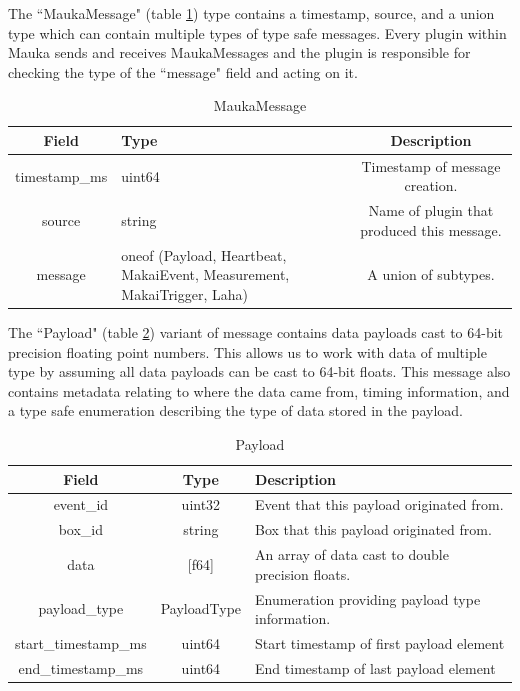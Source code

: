 The ``MaukaMessage" (table \ref{table:MaukaMessage}) type contains a timestamp, source, and a union type which can contain multiple types of type safe messages. Every plugin within Mauka sends and receives MaukaMessages and the plugin is responsible for checking the type of the ``message" field and acting on it.

\begin{table}[H]
	\centering
	\caption{MaukaMessage}
	\begin{tabular}{|c|p{6cm}|c|}
		\hline 
		Field & Type & Description  \\ 
		\hline 
		timestamp\_ms & uint64 & Timestamp of message creation.  \\ 
		\hline 
		source & string & Name of plugin that produced this message. \\ 
		\hline 
		message & oneof (Payload, Heartbeat, MakaiEvent, Measurement, MakaiTrigger, Laha) & A union of subtypes. \\ 
		\hline 
	\end{tabular} 
	\label{table:MaukaMessage}
\end{table}

The ``Payload" (table \ref{table:Payload}) variant of message contains data payloads cast to 64-bit precision floating point numbers. This allows us to work with data of multiple type by assuming all data payloads can be cast to 64-bit floats. This message also contains metadata relating to where the data came from, timing information, and a type safe enumeration describing the type of data stored in the payload.

\begin{table}[H]
	\centering
	\caption{Payload}
	\begin{tabular}{|c|c| p{8cm} |}
		\hline 
		Field & Type & Description  \\ 
		\hline 
		event\_id & uint32 & Event that this payload originated from.  \\ 
		\hline 
		box\_id & string & Box that this payload originated from. \\ 
		\hline 
		data & [f64] & An array of data cast to double precision floats. \\ 
		\hline
		payload\_type & PayloadType & Enumeration providing payload type information. \\
		start\_timestamp\_ms & uint64 & Start timestamp of first payload element \\
		\hline
		end\_timestamp\_ms & uint64 & End timestamp of last payload element\\
		\hline 
	\end{tabular} 
	\label{table:Payload}
\end{table}

